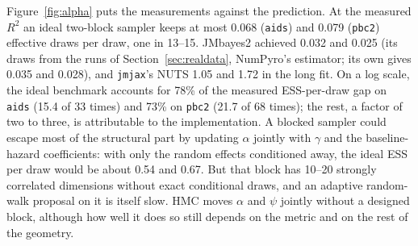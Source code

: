 Figure~\ref{fig:alpha} puts the measurements against the prediction. At
the measured $R^2$ an ideal two-block sampler keeps at most 0.068
(\texttt{aids}) and 0.079 (\texttt{pbc2}) effective draws per draw, one
in 13--15. JMbayes2 achieved 0.032 and 0.025 (its draws from the runs of
Section~\ref{sec:realdata}, NumPyro's estimator; its own gives 0.035 and 0.028),
and \texttt{jmjax}'s NUTS 1.05 and 1.72 in the long fit. On a log scale, the ideal benchmark accounts for 78\% of the measured
ESS-per-draw gap on \texttt{aids} (15.4 of 33 times) and 73\% on
\texttt{pbc2} (21.7 of 68 times); the rest, a factor of two to
three, is attributable to the implementation. A blocked sampler could
escape most of the structural part by updating $\alpha$ jointly with
$\gamma$ and the baseline-hazard coefficients: with only the random
effects conditioned away, the ideal ESS per draw would be about 0.54 and
0.67. But that block has 10--20 strongly correlated dimensions without
exact conditional draws, and an adaptive random-walk proposal on it is
itself slow. HMC moves $\alpha$ and $\psi$ jointly without a designed
block, although how well it does so still depends on the metric and on
the rest of the geometry.
